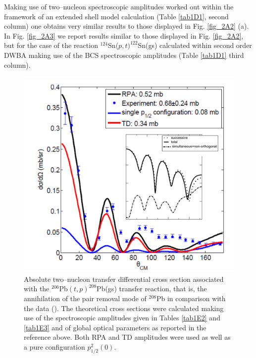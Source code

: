  Making use of two--nucleon spectroscopic amplitudes worked out within the framework of an extended shell model calculation (Table \ref{tab1D1}, second column) one obtains very similar results to those displayed in Fig. \ref{fig_2A2} (a). In Fig. \ref{fig_2A3} we report results similar to those displayed in Fig. \ref{fig_2A2}, but for the case of the reaction $^{124}$Sn($p,t)^{122}$Sn(gs) calculated within second order DWBA making use of the BCS spectroscopic amplitudes (Table \ref{tab1D1} third column). 


    \begin{figure}
    \centerline{\includegraphics*[width=\textwidth,angle=0]{nutshell/figs/tp_Pb_contributions.pdf}}
    \caption{Absolute two--nucleon transfer differential cross section associated with the $^{206}$Pb$(t,p)^{208}$Pb(gs) transfer reaction, that is, the annihilation of the pair removal mode of $^{208}$Pb in comparison with the data (\cite{Bjerregaard:66b}). The theoretical cross sections were calculated making use of the spectroscopic amplitudes given in Tables \ref{tab1E2} and \ref{tab1E3} and of global optical parameters as reported in the reference above. Both  RPA and TD amplitudes were used as well as a pure configuration $p_{1/2}^2(0)$.}\label{fig2A4}
    \end{figure}


